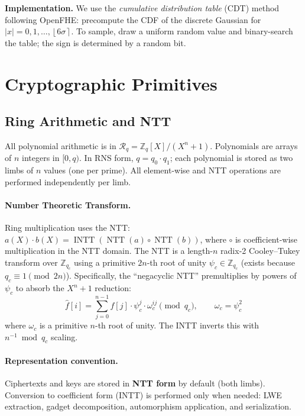 \documentclass[11pt,a4paper]{article}
\DeclareMathOperator{\NTT}{NTT}
\DeclareMathOperator{\INTT}{INTT}
\newcommand{\Z}{\mathbb{Z}}
\newcommand{\R}{\mathcal{R}}
\newcommand{\Rq}{\R_{q}}
\newcommand{\round}[1]{\left\lfloor #1 \right\rceil}
\begin{document}
\textbf{Implementation.}
We use the \emph{cumulative distribution table} (CDT) method following OpenFHE: precompute the CDF of the discrete Gaussian for $|x| = 0, 1, \ldots, \round{6\sigma}$.
To sample, draw a uniform random value and binary-search the table; the sign is determined by a random bit.

\section{Cryptographic Primitives}\label{sec:primitives}

\subsection{Ring Arithmetic and NTT}\label{sec:ring}

All polynomial arithmetic is in $\Rq = \Z_q[X]/(X^n+1)$.
Polynomials are arrays of $n$ integers in $[0, q)$.
In RNS form, $q = q_0 \cdot q_1$; each polynomial is stored as two limbs of $n$ values (one per prime).
All element-wise and NTT operations are performed independently per limb.

\paragraph{Number Theoretic Transform.}
Ring multiplication uses the NTT: $a(X) \cdot b(X) = \INTT(\NTT(a) \circ \NTT(b))$, where $\circ$ is coefficient-wise multiplication in the NTT domain.
The NTT is a length-$n$ radix-2 Cooley--Tukey transform over $\Z_{q_c}$ using a primitive $2n$-th root of unity $\psi_c \in \Z_{q_c}$ (exists because $q_c \equiv 1 \pmod{2n}$).
Specifically, the ``negacyclic NTT'' premultiplies by powers of $\psi_c$ to absorb the $X^n + 1$ reduction:
\[
    \hat{f}[i] = \sum_{j=0}^{n-1} f[j] \cdot \psi_c^{j} \cdot \omega_c^{ij} \pmod{q_c}, \qquad \omega_c = \psi_c^2
\]
where $\omega_c$ is a primitive $n$-th root of unity.
The INTT inverts this with $n^{-1} \bmod q_c$ scaling.

\paragraph{Representation convention.}
Ciphertexts and keys are stored in \textbf{NTT form} by default (both limbs).
Conversion to coefficient form (INTT) is performed only when needed: LWE extraction, gadget decomposition, automorphism application, and serialization.
\end{document}
